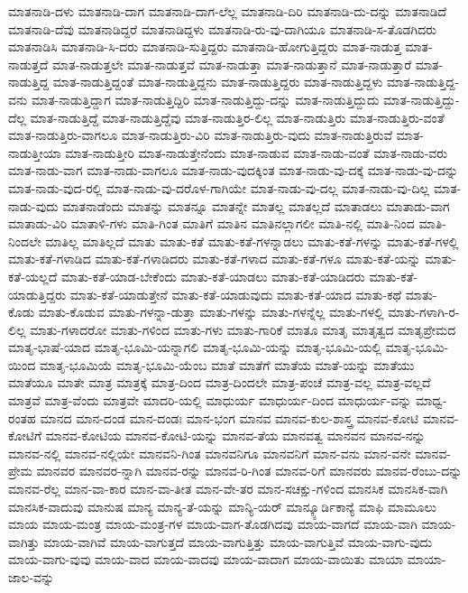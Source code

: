 {ಮಾತನಾಡಿ-ದಳು
ಮಾತನಾಡಿ-ದಾಗ
ಮಾತನಾಡಿ-ದಾಗ-ಲೆಲ್ಲ
ಮಾತನಾಡಿ-ದಿರಿ
ಮಾತನಾಡಿ-ದು-ದನ್ನು
ಮಾತನಾಡಿದೆ
ಮಾತನಾಡಿ-ದೆವು
ಮಾತನಾಡಿದ್ದರೆ
ಮಾತನಾಡಿದ್ದಳು
ಮಾತನಾಡಿ-ರು-ವು-ದಾಗಿಯೂ
ಮಾತನಾಡಿ-ಸ-ತೊಡಗಿದರು
ಮಾತನಾಡಿಸಿ
ಮಾತನಾಡಿ-ಸಿ-ದರು
ಮಾತನಾಡಿ-ಸುತ್ತಿದ್ದರು
ಮಾತನಾಡಿ-ಹೋಗುತ್ತಿದ್ದರು
ಮಾತ-ನಾಡುತ್ತ
ಮಾತ-ನಾಡುತ್ತದೆ
ಮಾತ-ನಾಡುತ್ತಲೇ
ಮಾತ-ನಾಡುತ್ತವೆ
ಮಾತ-ನಾಡುತ್ತಾ
ಮಾತ-ನಾಡುತ್ತಾನೆ
ಮಾತ-ನಾಡುತ್ತಾರೆ
ಮಾತ-ನಾಡುತ್ತಿದ್ದ
ಮಾತ-ನಾಡುತ್ತಿದ್ದಂತೆ
ಮಾತ-ನಾಡುತ್ತಿದ್ದನು
ಮಾತ-ನಾಡುತ್ತಿದ್ದರು
ಮಾತ-ನಾಡುತ್ತಿದ್ದಳು
ಮಾತ-ನಾಡುತ್ತಿದ್ದ-ವನು
ಮಾತ-ನಾಡುತ್ತಿದ್ದಾಗ
ಮಾತ-ನಾಡುತ್ತಿದ್ದಿರಿ
ಮಾತ-ನಾಡುತ್ತಿದ್ದು-ದನ್ನು
ಮಾತ-ನಾಡುತ್ತಿದ್ದುದು
ಮಾತ-ನಾಡುತ್ತಿದ್ದು-ದೆಲ್ಲ
ಮಾತ-ನಾಡುತ್ತಿದ್ದೆ
ಮಾತ-ನಾಡುತ್ತಿದ್ದೆವು
ಮಾತ-ನಾಡುತ್ತಿರ-ಲಿಲ್ಲ
ಮಾತ-ನಾಡುತ್ತಿರು
ಮಾತ-ನಾಡುತ್ತಿರು-ವಂತೆ
ಮಾತ-ನಾಡುತ್ತಿರು-ವಾಗಲೂ
ಮಾತ-ನಾಡುತ್ತಿರು-ವಿರಿ
ಮಾತ-ನಾಡುತ್ತಿರು-ವುದು
ಮಾತ-ನಾಡುತ್ತಿರುವೆ
ಮಾತ-ನಾಡುತ್ತೀಯಾ
ಮಾತ-ನಾಡುತ್ತೀರಿ
ಮಾತ-ನಾಡುತ್ತೇನೆಂದು
ಮಾತ-ನಾಡುವ
ಮಾತ-ನಾಡು-ವಂತೆ
ಮಾತ-ನಾಡು-ವರು
ಮಾತ-ನಾಡು-ವಾಗ
ಮಾತ-ನಾಡು-ವಾಗಲೂ
ಮಾತ-ನಾಡು-ವುದಕ್ಕಿಂತ
ಮಾತ-ನಾಡು-ವು-ದಕ್ಕೆ
ಮಾತ-ನಾಡು-ವು-ದನ್ನು
ಮಾತ-ನಾಡು-ವುದ-ರಲ್ಲಿ
ಮಾತ-ನಾಡು-ವು-ದರೊಳ-ಗಾಗಿಯೇ
ಮಾತ-ನಾಡು-ವು-ದಲ್ಲ
ಮಾತ-ನಾಡು-ವು-ದಿಲ್ಲ
ಮಾತ-ನಾಡು-ವುದು
ಮಾತನಾಡೆಂದು
ಮಾತನ್ನು
ಮಾತನ್ನೂ
ಮಾತನ್ನೇ
ಮಾತಲ್ಲ
ಮಾತಲ್ಲದೆ
ಮಾತಾಡಲು
ಮಾತಾಡು-ವಾಗ
ಮಾತಾಡು-ವಿರಿ
ಮಾತಾಳಿ-ಗಳು
ಮಾತಿ-ಗಿಂತ
ಮಾತಿಗೆ
ಮಾತಿನ
ಮಾತಿನಲ್ಲಾಗಲೀ
ಮಾತಿ-ನಲ್ಲಿ
ಮಾತಿ-ನಿಂದ
ಮಾತಿ-ನಿಂದಲೇ
ಮಾತಿಲ್ಲ
ಮಾತಿಲ್ಲದೆ
ಮಾತು
ಮಾತು-ಕತೆ
ಮಾತು-ಕತೆ-ಗಳನ್ನಾಡಲು
ಮಾತು-ಕತೆ-ಗಳನ್ನು
ಮಾತು-ಕತೆ-ಗಳಲ್ಲಿ
ಮಾತು-ಕತೆ-ಗಳಾಡಿದ
ಮಾತು-ಕತೆ-ಗಳಾಡಿದರು
ಮಾತು-ಕತೆ-ಗಳಾದ
ಮಾತು-ಕತೆ-ಗಳೂ
ಮಾತು-ಕತೆ-ಯನ್ನು
ಮಾತು-ಕತೆ-ಯಲ್ಲದೆ
ಮಾತು-ಕತೆ-ಯಾಡ-ಬೇಕೆಂದು
ಮಾತು-ಕತೆ-ಯಾಡಲು
ಮಾತು-ಕತೆ-ಯಾಡಿದರು
ಮಾತು-ಕತೆ-ಯಾಡುತ್ತಿದ್ದರು
ಮಾತು-ಕತೆ-ಯಾಡುತ್ತೇನೆ
ಮಾತು-ಕತೆ-ಯಾಡುವುದು
ಮಾತು-ಕತೆ-ಯಾದ
ಮಾತು-ಕಥೆ
ಮಾತು-ಕೊಡು
ಮಾತು-ಕೊಡುವ
ಮಾತು-ಗಳನ್ನಾ-ಡುತ್ತಾ
ಮಾತು-ಗಳನ್ನು
ಮಾತು-ಗಳನ್ನೆಲ್ಲ
ಮಾತು-ಗಳಲ್ಲಿ
ಮಾತು-ಗಳಾಗಿ-ರ-ಲಿಲ್ಲ
ಮಾತು-ಗಳಾದರೋ
ಮಾತು-ಗಳಿಂದ
ಮಾತು-ಗಳು
ಮಾತು-ಗಾರಿಕೆ
ಮಾತೂ
ಮಾತೃ
ಮಾತೃತ್ವದ
ಮಾತೃಪ್ರೇಮದ
ಮಾತೃ-ಭಾಷೆ-ಯಾದ
ಮಾತೃ-ಭೂಮಿ-ಯನ್ನಾಗಲಿ
ಮಾತೃ-ಭೂಮಿ-ಯನ್ನು
ಮಾತೃ-ಭೂಮಿ-ಯಲ್ಲಿ
ಮಾತೃ-ಭೂಮಿ-ಯಿಂದ
ಮಾತೃ-ಭೂಮಿಯೆ
ಮಾತೃ-ಭೂಮಿ-ಯೆಂಬ
ಮಾತೆ
ಮಾತೆಗೆ
ಮಾತೆಯ
ಮಾತೆ-ಯನ್ನು
ಮಾತೆಯು
ಮಾತೆಯೂ
ಮಾತೇ
ಮಾತ್ರ
ಮಾತ್ರಕ್ಕೆ
ಮಾತ್ರ-ದಿಂದ
ಮಾತ್ರ-ದಿಂದಲೇ
ಮಾತ್ರ-ಪಂಚೆ
ಮಾತ್ರ-ವಲ್ಲ
ಮಾತ್ರ-ವಲ್ಲದೆ
ಮಾತ್ರವೆ
ಮಾತ್ರ-ವೆಂದು
ಮಾತ್ರವೇ
ಮಾದರಿ-ಯಲ್ಲಿ
ಮಾಧುರ್ಯ
ಮಾಧುರ್ಯ-ದಿಂದ
ಮಾಧುರ್ಯ-ವನ್ನು
ಮಾಧ್ವ-ರಂತಹ
ಮಾನದ
ಮಾನ-ದಂಡ
ಮಾನ-ದಂಡಃ
ಮಾನ-ಭಂಗ
ಮಾನವ
ಮಾನವ-ಕುಲ-ಶಾಸ್ತ್ರ
ಮಾನವ-ಕೋಟಿ
ಮಾನವ-ಕೋಟಿಗೆ
ಮಾನವ-ಕೋಟಿಯ
ಮಾನವ-ಕೋಟಿ-ಯನ್ನು
ಮಾನವ-ತೆಯ
ಮಾನವತ್ವ
ಮಾನವನ
ಮಾನವ-ನನ್ನು
ಮಾನವ-ನಲ್ಲಿ
ಮಾನವ-ನಲ್ಲಿಯೇ
ಮಾನವನಿ-ಗಿಂತ
ಮಾನವನಿಗೂ
ಮಾನವನಿಗೆ
ಮಾನ-ವನು
ಮಾನ-ವನೇ
ಮಾನವ-ಪ್ರೇಮ
ಮಾನವರ
ಮಾನವರ-ನ್ನಾಗಿ
ಮಾನವ-ರನ್ನು
ಮಾನವ-ರಿ-ಗಿಂತ
ಮಾನವ-ರಿಗೆ
ಮಾನವರು
ಮಾನವ-ರೆಂಬು-ದನ್ನು
ಮಾನವ-ರೆಲ್ಲ
ಮಾನ-ವಾ-ಕಾರ
ಮಾನ-ವಾ-ತೀತ
ಮಾನ-ವೇ-ತರ
ಮಾನ-ಸಚಕ್ಷು-ಗಳಿಂದ
ಮಾನಸಿಕ
ಮಾನಸಿಕ-ವಾಗಿ
ಮಾನಸಿಕ-ವಾದುವು
ಮಾನುಷ
ಮಾನ್ಯ
ಮಾನ್ಯ-ತೆ-ಯನ್ನು
ಮಾನ್ಯಿ-ಯರ್
ಮಾನ್ಕ್ಯೂರ್ಡಿಕಾನ್ಯೆ
ಮಾಫಿ
ಮಾಮೂಲು
ಮಾಯ
ಮಾಯ-ಮಂತ್ರ
ಮಾಯ-ಮಂತ್ರ-ಗಳ
ಮಾಯ-ವಾಗ-ತೊಡಗಿದವು
ಮಾಯ-ವಾಗದೆ
ಮಾಯ-ವಾಗಿ
ಮಾಯ-ವಾಗಿತ್ತು
ಮಾಯ-ವಾಗಿವೆ
ಮಾಯ-ವಾಗುತ್ತದೆ
ಮಾಯ-ವಾಗುತ್ತಿತ್ತು
ಮಾಯ-ವಾಗುತ್ತಿವೆ
ಮಾಯ-ವಾಗು-ವುದು
ಮಾಯ-ವಾಗು-ವುವು
ಮಾಯ-ವಾದ
ಮಾಯ-ವಾದವು
ಮಾಯ-ವಾದಾಗ
ಮಾಯ-ವಾಯಿತು
ಮಾಯಾ
ಮಾಯಾ-ಜಾಲ-ವನ್ನು
}
